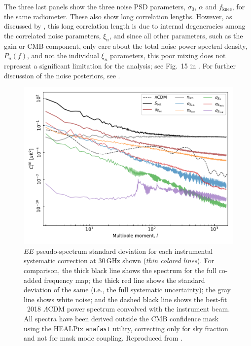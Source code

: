 \documentclass[twocolumn]{aa}
\begin{document}
The three last panels show the three noise PSD parameters, $\sigma_0$,
$\alpha$ and $f_{\mathrm{knee}}$, for the same radiometer. These also
show long correlation lengths. However, as discussed by
\citet{bp04,bp06}, this long correlation length is due to internal
degeneracies among the correlated noise parameters, $\xi_n$, and since
all other parameters, such as the gain or CMB component, only care
about the total noise power spectral density, $P_n(f)$, and not the
individual $\xi_n$ parameters, this poor mixing does not represent a
significant limitation for the analysis; see Fig.~15 in
\citet{bp04}. For further discussion of the noise posteriors, see
\citet{bp06}.

\begin{figure}[t]
  \center
  \includegraphics[width=\linewidth]{figs/30GHz_EE_power_spectra.pdf}
  \caption{$EE$ pseudo-spectrum standard deviation for each
    instrumental systematic correction at 30\,GHz shown (\emph{thin
      colored lines}). For comparison, the thick black line shows the
    spectrum for the full co-added frequency map; the thick red line
    shows the standard deviation of the same (i.e., the full
    systematic uncertainty); the gray line shows white noise; and the
    dashed black line shows the best-fit \Planck\ 2018 $\Lambda$CDM
    power spectrum convolved with the instrument beam. All spectra
    have been derived outside the CMB confidence mask \citep{bp13}
    using the HEALPix \texttt{anafast} utility, correcting only for
    sky fraction and not for mask mode coupling. Reproduced from
    \citep{bp10}. \label{fig:corrmap_powspec_stddev} }
\end{figure}
\end{document}
